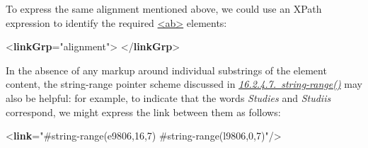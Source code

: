 To express the same alignment mentioned above, we could use an XPath expression to identify the required \hyperref[TEI.ab]{<ab>} elements: \par\bgroup{}\exampleFont \begin{shaded}\noindent\mbox{}{<\textbf{linkGrp}\hspace*{1em}{type}="{alignment}">}\mbox{}\newline 
{}\mbox{}\newline 
{}\mbox{}\newline 
{</\textbf{linkGrp}>}\end{shaded}\egroup\par \noindent  In the absence of any markup around individual substrings of the element content, the string-range pointer scheme discussed in \textit{\hyperref[SATSSR]{16.2.4.7.\ string-range()}} may also be helpful: for example, to indicate that the words \textit{Studies} and \textit{Studiis} correspond, we might express the link between them as follows: \par\bgroup{}\exampleFont \begin{shaded}\noindent\mbox{}{<\textbf{link}\hspace*{1em}{target}="{\#string-range(e9806,16,7) \#string-range(l9806,0,7)}"/>}\end{shaded}\egroup\par 
